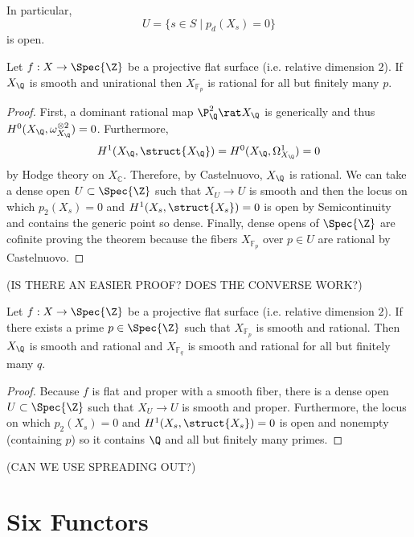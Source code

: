 \documentclass[12pt]{article}
\begin{document}
\begin{rmk}
In particular,
\[ U = \{ s \in S \mid p_d(X_s) = 0 \} \]
is open. 
\end{rmk}

\begin{theorem}
Let $f : X \to \Spec{\Z}$ be a projective flat surface (i.e. relative dimension $2$). If $X_\Q$ is smooth and unirational then $X_{\mathbb{F}_p}$ is rational for all but finitely many $p$.
\end{theorem}

\begin{proof}
First, a dominant rational map $\P^2_\Q \rat X_\Q$ is generically \etale and thus $H^0(X_\Q, \omega_{X_\Q}^{\otimes 2}) = 0$. Furthermore, 
\[ H^1(X_\Q, \struct{X_\Q}) = H^0(X_\Q, \Omega^1_{X_\Q}) = 0 \] 
by Hodge theory on $X_{\mathbb{C}}$. Therefore, by Castelnuovo, $X_\Q$ is rational. We can take a dense open $U \subset \Spec{\Z}$ such that $X_U \to  U$ is smooth and then the locus on which $p_2(X_s) = 0$ and $H^1(X_s, \struct{X_s}) = 0$ is open by Semicontinuity and contains the generic point so dense. Finally, dense opens of $\Spec{\Z}$ are cofinite proving the theorem because the fibers $X_{\mathbb{F}_p}$ over $p \in U$ are rational by Castelnuovo. 
\end{proof}

(IS THERE AN EASIER PROOF? DOES THE CONVERSE WORK?)

\begin{theorem}
Let $f : X \to \Spec{\Z}$ be a projective flat surface (i.e. relative dimension $2$). If there exists a prime $p \in \Spec{\Z}$ such that $X_{\mathbb{F}_p}$ is smooth and rational. Then $X_{\Q}$ is smooth and rational and $X_{\mathbb{F}_q}$ is smooth and rational for all but finitely many $q$.
\end{theorem}

\begin{proof}
Because $f$ is flat and proper with a smooth fiber, there is a dense open $U \subset \Spec{\Z}$ such that $X_U \to U$ is smooth and proper. Furthermore, the locus on which $p_2(X_s) = 0$ and $H^1(X_s, \struct{X_s}) = 0$ is open and nonempty (containing $p$) so it contains $\Q$ and all but finitely many primes.
\end{proof}

(CAN WE USE SPREADING OUT?)

\section{Six Functors}
\end{document}
